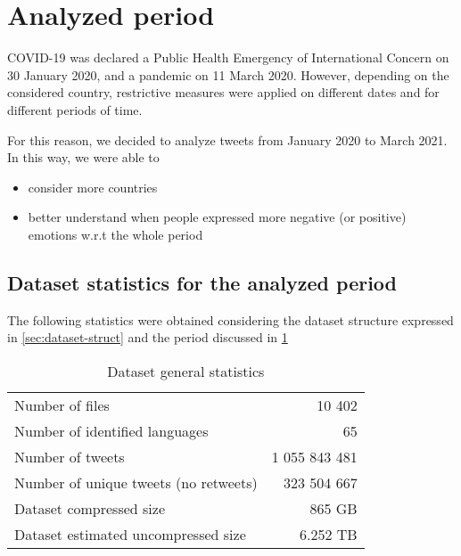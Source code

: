 \section{Analyzed period}
\label{sec:period}
COVID-19 was declared a Public Health Emergency of International Concern on 30 January 2020, and a pandemic on 11 March 2020. However, depending on the considered country, restrictive measures were applied on different dates and for different periods of time. 

For this reason, we decided to analyze tweets from January 2020 to March 2021. In this way, we were able to

\begin{itemize}
	\item consider more countries
	\item better understand when people expressed more negative (or positive) emotions w.r.t the whole period
\end{itemize}

\subsection{Dataset statistics for the analyzed period}
\label{subsec:dataset-stats}

The following statistics were obtained considering the dataset structure expressed in \cref{sec:dataset-struct} and the period discussed in \cref{sec:period}

\begin{table}[H]
    \centering
    \begin{tabularx}{\columnwidth}{@{}Xr@{}}
        Number of files & 10 402
        \\
        Number of identified languages & 65
        \\
        Number of tweets & 1 055 843 481
        \\
        Number of unique tweets (no retweets) & 323 504 667
        \\
        Dataset compressed size & 865 GB
        \\
        Dataset estimated uncompressed size & 6.252 TB
    \end{tabularx}
    \caption{Dataset general statistics}
    \label{tab:dataset-stats}
\end{table}

